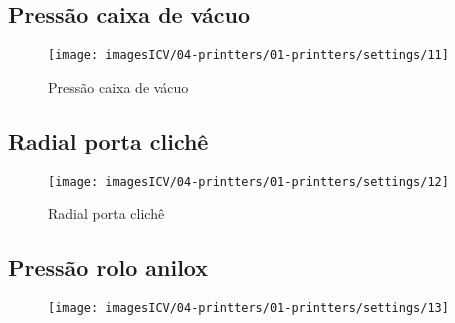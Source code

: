 \subsection{Pressão caixa de vácuo}
\begin{figure}
    \centering
    \texttt{[image: imagesICV/04-printters/01-printters/settings/11]}
    \caption{Pressão caixa de vácuo}
\end{figure}
\newpage
\thispagestyle{fancy}
\vspace{\fill}

\subsection{Radial porta clichê}
\begin{figure}
    \centering
    \texttt{[image: imagesICV/04-printters/01-printters/settings/12]}
    \caption{Radial porta clichê}
\end{figure}
\newpage
\thispagestyle{fancy}
\vspace{\fill}

\subsection{Pressão rolo anilox}
\begin{figure}
    \centering
    \texttt{[image: imagesICV/04-printters/01-printters/settings/13]}
    \caption{}
\end{figure}